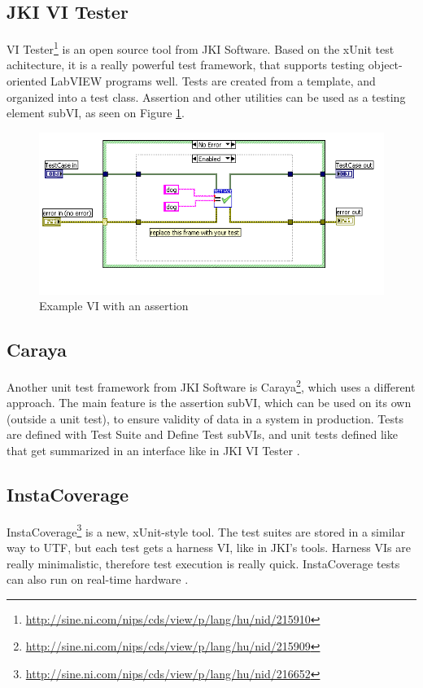 \subsection{JKI VI Tester}
VI Tester\footnote{\url{http://sine.ni.com/nips/cds/view/p/lang/hu/nid/215910}} is an open source tool from JKI Software. Based on the xUnit test achitecture, it is a really powerful test framework, that supports testing object-oriented LabVIEW programs well. Tests are created from a template, and organized into a test class. Assertion and other utilities can be used as a testing element subVI, as seen on Figure \ref{fig:vitester}. \cite{vitesterwiki}
\begin{figure}
\centering
\includegraphics[width=120mm,keepaspectratio]{figures/vitester.png}
\caption{Example VI with an assertion} 
\label{fig:vitester}
\end{figure}
\subsection{Caraya}
Another unit test framework from JKI Software is Caraya\footnote{\url{http://sine.ni.com/nips/cds/view/p/lang/hu/nid/215909}}, which uses a different approach. The main feature is the assertion subVI, which can be used on its own (outside a unit test), to ensure validity of data in a system in production. Tests are defined with Test Suite and Define Test subVIs, and unit tests defined like that get summarized in an interface like in JKI VI Tester \cite{carayapages}. 
\subsection{InstaCoverage}
InstaCoverage\footnote{\url{http://sine.ni.com/nips/cds/view/p/lang/hu/nid/216652}} is a new, xUnit-style tool. The test suites are stored in a similar way to UTF, but each test gets a harness VI, like in JKI's tools. Harness VIs are really minimalistic, therefore test execution is really quick. InstaCoverage tests can also run on real-time hardware \cite{icovsite}. 
